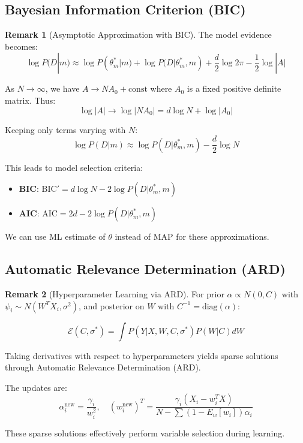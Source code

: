\documentclass[12pt,a4paper]{article}
\theoremstyle{definition}
\newtheorem{remark}{Remark}[section]
\begin{document}
\subsection{Bayesian Information Criterion (BIC)}

\begin{remark}[Asymptotic Approximation with BIC]
The model evidence becomes:
\[
\log P(D | m) \approx \log P(\theta_m^* | m) + \log P(D | \theta_m^*, m) + \frac{d}{2} \log 2\pi - \frac{1}{2} \log |A|
\]

As $N \to \infty$, we have $A \to N A_0 + \text{const}$ where $A_0$ is a fixed positive definite matrix. Thus:
\[
\log |A| \to \log |N A_0| = d \log N + \log |A_0|
\]

Keeping only terms varying with $N$:
\[
\log P(D | m) \approx \log P(D | \theta_m^*, m) - \frac{d}{2} \log N
\]

This leads to model selection criteria:
\begin{itemize}
    \item \textbf{BIC}: $\text{BIC}' = d \log N - 2 \log P(D | \theta_m^*, m)$
    \item \textbf{AIC}: $\text{AIC} = 2d - 2 \log P(D | \theta_m^*, m)$
\end{itemize}

We can use ML estimate of $\theta$ instead of MAP for these approximations.
\end{remark}

\subsection{Automatic Relevance Determination (ARD)}

\begin{remark}[Hyperparameter Learning via ARD]
For prior $\alpha \propto N(0, C)$ with $\psi_i \sim N(W^T X_i, \sigma^2)$, and posterior on $W$ with $C^{-1} = \text{diag}(\alpha)$:

\[
\mathcal{E}(C, \sigma^*) = \int P(Y | X, W, C, \sigma^*) P(W | C) dW
\]

Taking derivatives with respect to hyperparameters yields sparse solutions through Automatic Relevance Determination (ARD).

The updates are:
\[
\alpha_i^{\text{new}} = \frac{\gamma_i}{w_i^2}, \quad (w_i^{\text{new}})^T = \frac{\gamma_i(X_i - w_i^T X)}{N - \sum (1 - E_w[w_i]) \alpha_i}
\]

These sparse solutions effectively perform variable selection during learning.
\end{remark}
\end{document}
